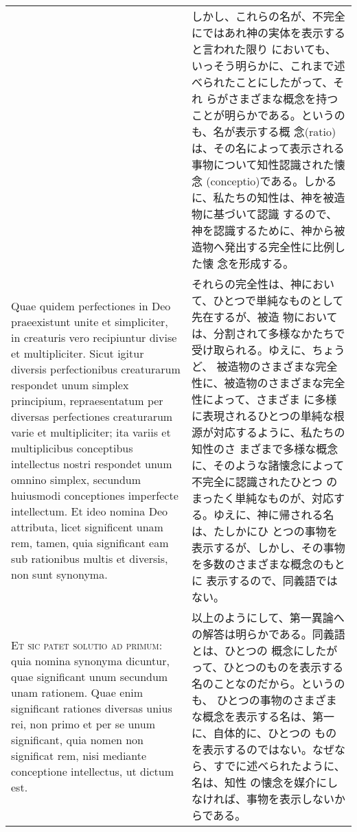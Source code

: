 \documentclass[paper=a4paper,fontsize=10pt,jafontsize=9pt,titlepage]{jlreq}
\begin{document}
\begin{longtable}{p{21em}p{21em}}
&

しかし、これらの名が、不完全にではあれ神の実体を表示すると言われた限り
においても、いっそう明らかに、これまで述べられたことにしたがって、それ
らがさまざまな概念を持つことが明らかである。というのも、名が表示する概
念(ratio)は、その名によって表示される事物について知性認識された懐念
(conceptio)である。しかるに、私たちの知性は、神を被造物に基づいて認識
するので、神を認識するために、神から被造物へ発出する完全性に比例した懐
念を形成する。

\\

Quae quidem perfectiones in Deo praeexistunt unite et simpliciter, in
creaturis vero recipiuntur divise et multipliciter. Sicut igitur
diversis perfectionibus creaturarum respondet unum simplex principium,
repraesentatum per diversas perfectiones creaturarum varie et
multipliciter; ita variis et multiplicibus conceptibus intellectus
nostri respondet unum omnino simplex, secundum huiusmodi conceptiones
imperfecte intellectum. Et ideo nomina Deo attributa, licet
significent unam rem, tamen, quia significant eam sub rationibus
multis et diversis, non sunt synonyma.

&

それらの完全性は、神において、ひとつで単純なものとして先在するが、被造
物においては、分割されて多様なかたちで受け取られる。ゆえに、ちょうど、
被造物のさまざまな完全性に、被造物のさまざまな完全性によって、さまざま
に多様に表現されるひとつの単純な根源が対応するように、私たちの知性のさ
まざまで多様な概念に、そのような諸懐念によって不完全に認識されたひとつ
のまったく単純なものが、対応する。ゆえに、神に帰される名は、たしかにひ
とつの事物を表示するが、しかし、その事物を多数のさまざまな概念のもとに
表示するので、同義語ではない。

\\

{\scshape Et sic patet solutio ad primum}: quia nomina synonyma dicuntur,
quae significant unum secundum unam rationem. Quae enim significant
rationes diversas unius rei, non primo et per se unum significant,
quia nomen non significat rem, nisi mediante conceptione intellectus,
ut dictum est.

&

以上のようにして、第一異論への解答は明らかである。同義語とは、ひとつの
概念にしたがって、ひとつのものを表示する名のことなのだから。というのも、
ひとつの事物のさまざまな概念を表示する名は、第一に、自体的に、ひとつの
ものを表示するのではない。なぜなら、すでに述べられたように、名は、知性
の懐念を媒介にしなければ、事物を表示しないからである。


\end{longtable}
\end{document}
